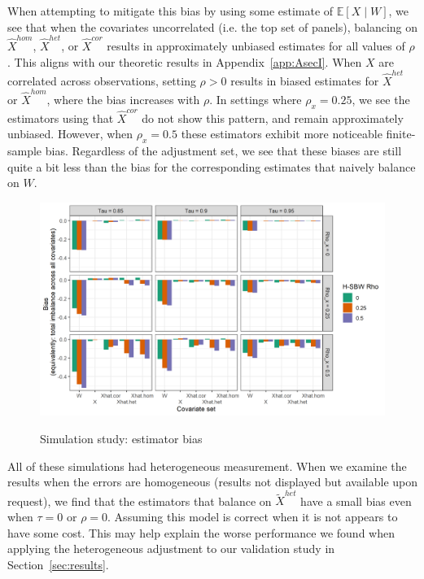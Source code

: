 When attempting to mitigate this bias by using some estimate of $\mathbb{E}[X \mid W]$, we see that when the covariates  uncorrelated (i.e. the top set of panels), balancing on $\hat{X}^{hom}$, $\hat{X}^{het}$, or $\hat{X}^{cor}$ results in approximately unbiased estimates for all values of $\rho$. This aligns with our theoretic results in Appendix~\ref{app:AsecI}. When $X$ are correlated across observations, setting $\rho > 0$ results in biased estimates for $\hat{X}^{het}$ or $\hat{X}^{hom}$, where the bias increases with $\rho$. In settings where $\rho_x = 0.25$, we see the estimators using that $\hat{X}^{cor}$ do not show this pattern, and remain approximately unbiased. However, when $\rho_x = 0.5$ these estimators exhibit more noticeable finite-sample bias. Regardless of the adjustment set, we see that these biases are still quite a bit less than the bias for the corresponding estimates that naively balance on $W$. 

\begin{figure}[H]
\begin{center}
    \caption{Simulation study: estimator bias}\label{fig:simbias}
    \label{fig:loveplotc1}
    \includegraphics[scale=0.5]{01_Plots/bias-plot.png}
\end{center}
\end{figure}

All of these simulations had heterogeneous measurement. When we examine the results when the errors are homogeneous (results not displayed but available upon request), we find that the estimators that balance on $\tilde{X}^{het}$ have a small bias even when $\tau = 0$ or $\rho = 0$. Assuming this model is correct when it is not appears to have some cost. This may help explain the worse performance we found when applying the heterogeneous adjustment to our validation study in Section~\ref{sec:results}.

